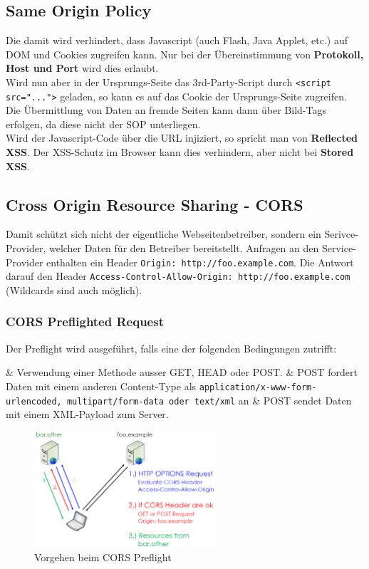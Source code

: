 \subsection{Same Origin Policy}
Die damit wird verhindert, dass Javascript (auch Flash, Java Applet, etc.) auf DOM und Cookies zugreifen kann. Nur bei der Übereinstimmung von \textbf{Protokoll, Host und Port} wird dies erlaubt.\\
Wird nun aber in der Ursprungs-Seite das 3rd-Party-Script durch \lstinline|<script src="...">| geladen, so kann es auf das Cookie der Ursprungs-Seite zugreifen.\\
Die Übermittlung von Daten an fremde Seiten kann dann über Bild-Tags erfolgen, da diese nicht der SOP unterliegen.\\
Wird der Javascript-Code über die URL injiziert, so spricht man von \textbf{Reflected XSS}. Der XSS-Schutz im Browser kann dies verhindern, aber nicht bei \textbf{Stored XSS}.

\subsection{Cross Origin Resource Sharing - CORS}
Damit schützt sich nicht der eigentliche Webseitenbetreiber, sondern ein Serivce-Provider, welcher Daten für den Betreiber bereitstellt. Anfragen an den Service-Provider enthalten ein Header \lstinline|Origin: http://foo.example.com|. Die Antwort darauf den Header \lstinline|Access-Control-Allow-Origin: http://foo.example.com| (Wildcards sind auch möglich).

\subsubsection{CORS Preflighted Request}

Der Preflight wird ausgeführt, falls eine der folgenden Bedingungen zutrifft:
\begin{easylist}[itemize]
	& Verwendung einer Methode ausser GET, HEAD oder POST.
	& POST fordert Daten mit einem anderen Content-Type als \lstinline|application/x-www-form-urlencoded, multipart/form-data oder text/xml| an
	& POST sendet Daten mit einem XML-Payload zum Server.
\end{easylist}

\begin{figure}[H]
	\centering
	\includegraphics[width=0.6\textwidth]{./img/cors-preflight}
	\caption{Vorgehen beim CORS Preflight}
\end{figure}

